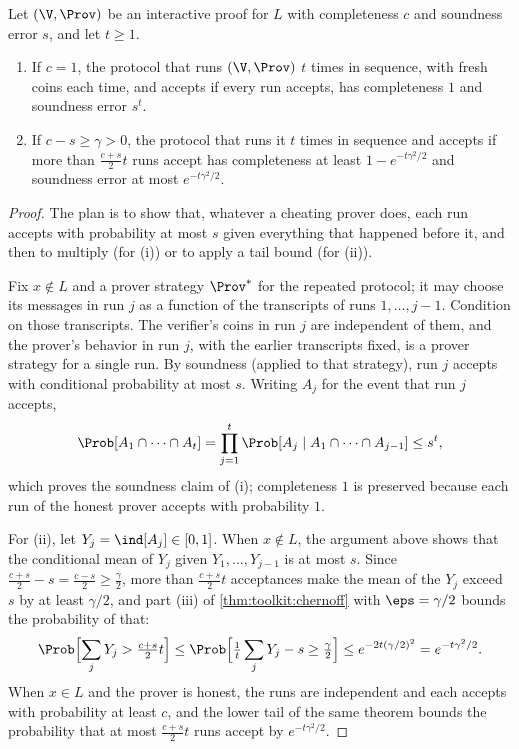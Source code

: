 \begin{refsection}
\begin{proposition}\label{prop:toolkit:amplification}
Let $(\V,\Prov)$ be an interactive proof for $L$ with completeness $c$ and soundness error $s$, and let $t\ge1$.
\begin{enumerate}
\item If $c=1$, the protocol that runs $(\V,\Prov)$ $t$ times in sequence, with fresh coins each time, and accepts if every run accepts, has completeness $1$ and soundness error $s^t$.
\item If $c-s\ge\gamma>0$, the protocol that runs it $t$ times in sequence and accepts if more than $\frac{c+s}{2}t$ runs accept has completeness at least $1-e^{-t\gamma^2/2}$ and soundness error at most $e^{-t\gamma^2/2}$.
\end{enumerate}
\end{proposition}

\begin{proof}
The plan is to show that, whatever a cheating prover does, each run accepts with probability at most $s$ given everything that happened before it, and then to multiply (for (i)) or to apply a tail bound (for (ii)).

Fix $x\notin L$ and a prover strategy $\Prov^*$ for the repeated protocol; it may choose its messages in run $j$ as a function of the transcripts of runs $1,\dots,j-1$. Condition on those transcripts. The verifier's coins in run $j$ are independent of them, and the prover's behavior in run $j$, with the earlier transcripts fixed, is a prover strategy for a single run. By soundness (applied to that strategy), run $j$ accepts with conditional probability at most $s$. Writing $A_j$ for the event that run $j$ accepts,
\[
\Prob[A_1\cap\dots\cap A_t]=\prod_{j=1}^t\Prob[A_j\mid A_1\cap\dots\cap A_{j-1}]\le s^t,
\]
which proves the soundness claim of (i); completeness $1$ is preserved because each run of the honest prover accepts with probability $1$.

For (ii), let $Y_j=\ind[A_j]\in[0,1]$. When $x\notin L$, the argument above shows that the conditional mean of $Y_j$ given $Y_1,\dots,Y_{j-1}$ is at most $s$. Since $\frac{c+s}{2}-s=\frac{c-s}{2}\ge\frac{\gamma}{2}$, more than $\frac{c+s}{2}t$ acceptances make the mean of the $Y_j$ exceed $s$ by at least $\gamma/2$, and part (iii) of \cref{thm:toolkit:chernoff} with $\eps=\gamma/2$ bounds the probability of that:
\[
\Prob\Bigl[\sum_jY_j>\tfrac{c+s}{2}t\Bigr]\le\Prob\Bigl[\tfrac1t\sum_jY_j-s\ge\tfrac{\gamma}{2}\Bigr]\le e^{-2t(\gamma/2)^2}=e^{-t\gamma^2/2}.
\]
When $x\in L$ and the prover is honest, the runs are independent and each accepts with probability at least $c$, and the lower tail of the same theorem bounds the probability that at most $\frac{c+s}{2}t$ runs accept by $e^{-t\gamma^2/2}$.
\end{proof}


\end{refsection}

